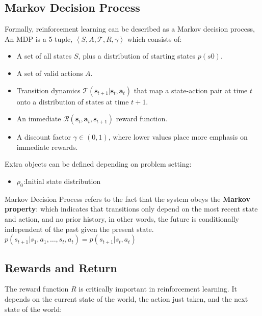 

\clearpage

\subsection{Markov Decision Process}
Formally, reinforcement learning can be described as a Markov decision process, An MDP is a 5-tuple, $ \left\langle S, A, \mathcal{T}, R, \gamma \right\rangle $ which consists of:

\begin{itemize}
		\item A set of all states \(S\), plus a distribution of starting states \(p(s0)\).
		\item A set of valid actions \(A\).
		\item Transition dynamics $ \mathcal{T}\left(\mathbf{s}_{t+1} | \mathbf{s}_{t}, \mathbf{a}_{t}\right) $ that map a state-action pair at time \(t\) onto a distribution of states at time \(t+1\).
		\item An immediate $ \mathcal{R}\left(\mathbf{s}_{t}, \mathbf{a}_{t}, \mathbf{s}_{t+1}\right) $ reward function.
		\item A discount factor \(\gamma \in(0,1)\), where lower values place more emphasis on immediate rewards.
\end{itemize}

Extra objects can be defined depending on problem setting:
\begin{itemize}
		\item $\rho_0$:Initial state distribution
\end{itemize}

Markov Decision Process refers to the fact that the system obeys the \textbf{Markov property}: which indicates that transitions only depend on the most recent state and action, and no prior history, in other words, the future is conditionally independent of the past given the present state. $ p\left(s_{t+1} | s_{1}, a_{1}, \ldots, s_{t}, a_{t}\right)=p\left(s_{t+1} | s_{t}, a_{t}\right) $


\subsection{Rewards and Return}

The reward function \(R\) is critically important in reinforcement learning. It depends on the current state of the world, the action just taken, and the next state of the world:

